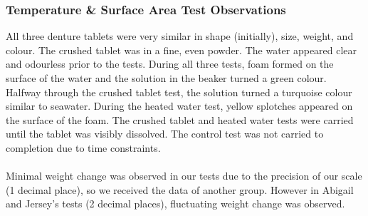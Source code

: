     \begin{table}[H]
        \centering
        \caption{Change in Mass Over Time of Open Denture Tablet Reactions.}
        
        \vspace{0.5em}
        {
            \aboverulesep=0pt
            \belowrulesep=0pt
        }
        \end{table}
\subsubsection{Temperature \& Surface Area Test Observations}
All three denture tablets were very similar in shape (initially), size, weight, and colour. The crushed tablet was in a fine, even powder. The water appeared clear and odourless prior to the tests. During all three tests, foam formed on the surface of the water and the solution in the beaker turned a green colour.
Halfway through the crushed tablet test, the solution turned a turquoise colour similar to seawater.  During the heated water test, yellow splotches appeared on the surface of the foam.
The crushed tablet and heated water tests were carried until the tablet was visibly dissolved. The control test was not carried to completion due to time constraints.
\\ \\
Minimal weight change was observed in our tests due to the precision of our scale (1 decimal place), so we received the data of another group. However in Abigail and Jersey's tests (2 decimal places), fluctuating weight change was observed.

